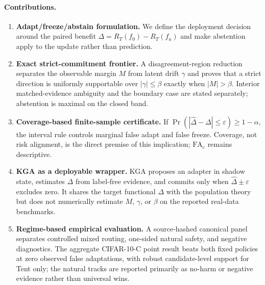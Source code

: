 \paragraph{Contributions.}
\begin{enumerate}
\item \textbf{Adapt/freeze/abstain formulation.} We define the deployment decision around the paired
benefit $\Delta=R_T(f_0)-R_T(f_a)$ and make abstention apply to the update rather than prediction.
\item \textbf{Exact strict-commitment frontier.} A disagreement-region reduction separates the
observable margin $M$ from latent drift $\gamma$ and proves that a strict direction is uniformly
supportable over $|\gamma|\le\beta$ exactly when $|M|>\beta$. Interior matched-evidence ambiguity
and the boundary case are stated separately; abstention is maximal on the closed band.
\item \textbf{Coverage-based finite-sample certificate.} If
$\Pr(|\widehat\Delta-\Delta|\le\varepsilon)\ge1-\alpha$, the interval rule controls marginal false
adapt and false freeze. Coverage, not risk alignment, is the direct premise of this implication;
$\mathrm{FA}_{\mathrm c}$ remains descriptive.
\item \textbf{KGA as a deployable wrapper.} KGA proposes an adapter in shadow state, estimates
$\Delta$ from label-free evidence, and commits only when $\widehat\Delta\pm\varepsilon$ excludes
zero. It shares the target functional $\Delta$ with the population theory but does not numerically
estimate $M$, $\gamma$, or $\beta$ on the reported real-data benchmarks.
\item \textbf{Regime-based empirical evaluation.} A source-hashed canonical panel separates
controlled mixed routing, one-sided natural safety, and negative diagnostics. The aggregate
CIFAR-10-C point result beats both fixed policies at zero observed false adaptations, with robust
candidate-level support for Tent only; the natural tracks are reported primarily as no-harm or
negative evidence rather than universal wins.
\end{enumerate}

